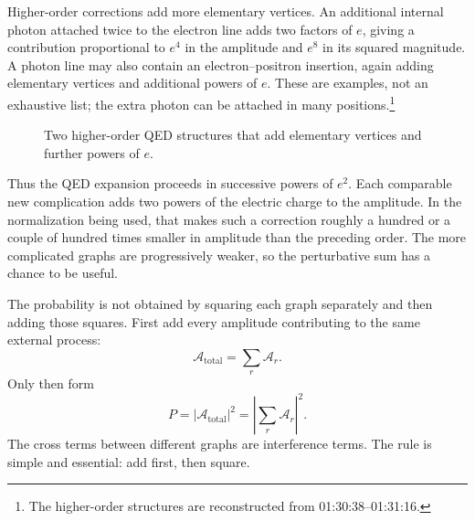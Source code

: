 Higher-order corrections add more elementary vertices. An additional internal photon attached twice to the electron line adds two factors of \(e\), giving a contribution proportional to \(e^4\) in the amplitude and \(e^8\) in its squared magnitude. A photon line may also contain an electron--positron insertion, again adding elementary vertices and additional powers of \(e\). These are examples, not an exhaustive list; the extra photon can be attached in many positions.\footnote{The higher-order structures are reconstructed from 01:30:38--01:31:16.}

\begin{figure}[htbp]
\centering
{}
\caption{Two higher-order QED structures that add elementary vertices and further powers of \(e\).}
\end{figure}

Thus the QED expansion proceeds in successive powers of \(e^2\). Each comparable new complication adds two powers of the electric charge to the amplitude. In the normalization being used, that makes such a correction roughly a hundred or a couple of hundred times smaller in amplitude than the preceding order. The more complicated graphs are progressively weaker, so the perturbative sum has a chance to be useful.

The probability is not obtained by squaring each graph separately and then adding those squares. First add every amplitude contributing to the same external process:
\begin{equation}
\mathcal{A}_{\mathrm{total}}=\sum_r\mathcal{A}_r.
\end{equation}
Only then form
\begin{equation}
P=\left|\mathcal{A}_{\mathrm{total}}\right|^2
=\left|\sum_r\mathcal{A}_r\right|^2.
\end{equation}
The cross terms between different graphs are interference terms. The rule is simple and essential: add first, then square.

